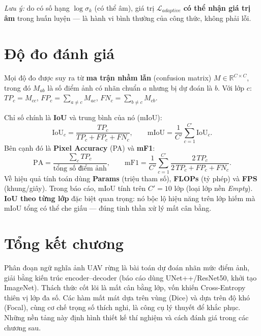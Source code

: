 \noindent\textit{Lưu ý:} do có số hạng $\log\sigma_k$ (có thể âm), giá trị
$\mathcal{L}_{adaptive}$ \textbf{có thể nhận giá trị âm} trong huấn luyện --- là hành vi
bình thường của công thức, không phải lỗi.

\section{Độ đo đánh giá}
\label{sec:metrics}

Mọi độ đo được suy ra từ \textbf{ma trận nhầm lẫn} (confusion matrix) $M\in\mathbb{R}^{C\times C}$,
trong đó $M_{ab}$ là số điểm ảnh có nhãn chuẩn $a$ nhưng bị dự đoán là $b$. Với lớp
$c$: $TP_c=M_{cc}$, $FP_c=\sum_{a\neq c}M_{ac}$, $FN_c=\sum_{b\neq c}M_{cb}$.

Chỉ số chính là \textbf{IoU} và trung bình của nó (mIoU):
\begin{equation}
\mathrm{IoU}_c = \frac{TP_c}{TP_c + FP_c + FN_c}, \qquad
\mathrm{mIoU} = \frac{1}{C'}\sum_{c=1}^{C'}\mathrm{IoU}_c.
\label{eq:miou}
\end{equation}
Bên cạnh đó là \textbf{Pixel Accuracy} (PA) và \textbf{mF1}:
\begin{equation}
\mathrm{PA} = \frac{\sum_c TP_c}{\text{tổng số điểm ảnh}}, \qquad
\mathrm{mF1} = \frac{1}{C'}\sum_{c=1}^{C'}\frac{2\,TP_c}{2\,TP_c + FP_c + FN_c}.
\end{equation}
Về hiệu quả tính toán dùng \textbf{Params} (triệu tham số), \textbf{FLOPs} (tỷ phép) và
\textbf{FPS} (khung/giây). Trong báo cáo, mIoU tính trên $C' = 10$ lớp (loại lớp nền
\textit{Empty}). \textbf{IoU theo từng lớp} đặc biệt quan trọng: nó bộc lộ hiệu năng
trên lớp hiếm mà mIoU tổng có thể che giấu --- đúng tinh thần xử lý mất cân bằng.

\section{Tổng kết chương}
Phân đoạn ngữ nghĩa ảnh UAV rừng là bài toán dự đoán nhãn mức điểm ảnh, giải bằng kiến
trúc encoder--decoder (báo cáo dùng UNet++/ResNet50, khởi tạo ImageNet). Thách thức cốt
lõi là mất cân bằng lớp, vốn khiến Cross-Entropy thiên vị lớp đa số. Các hàm mất mát
dựa trên vùng (Dice) và dựa trên độ khó (Focal), cùng cơ chế trọng số thích nghi, là
công cụ lý thuyết để khắc phục. Những nền tảng này định hình thiết kế thí nghiệm và
cách đánh giá trong các chương sau.
